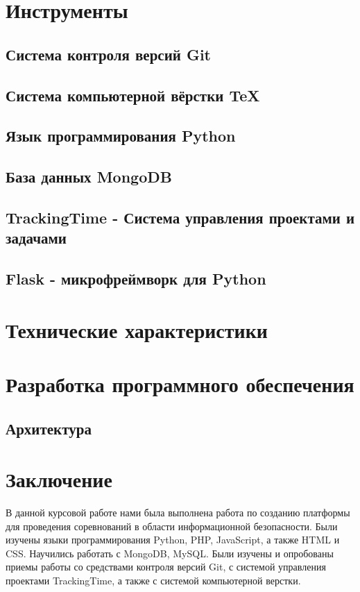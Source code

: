 \section{Инструменты}
\setcounter{figure}{0}
\subsection{Система контроля версий Git}

\subsection{Система компьютерной вёрстки \TeX}

\subsection{Язык программирования Python}

\subsection{База данных MongoDB}

\subsection{TrackingTime - Система управления проектами и задачами}

\subsection{Flask - микрофреймворк для Python}


\newpage
\section{Технические характеристики}


\section{Разработка программного обеспечения}
\setcounter{figure}{0}
 
\subsection{Архитектура}


\newpage
\section*{Заключение}
В данной курсовой работе нами была выполнена работа по созданию платформы для проведения соревнований в области информационной безопасности. Были изучены языки программирования Python, PHP, JavaScript, а также HTML и CSS. Научились работать с MongoDB, MySQL. Были изучены и опробованы приемы работы со средствами контроля версий Git, с системой управления проектами TrackingTime, а также с системой компьютерной верстки. 

